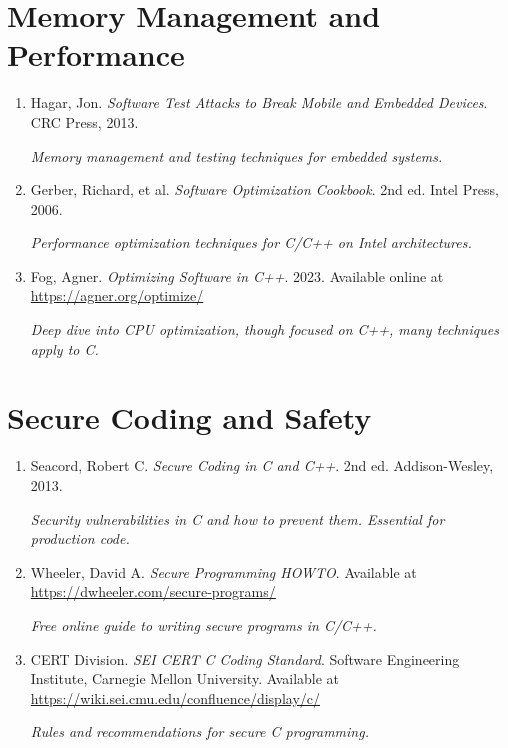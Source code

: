 \documentclass[10pt,openany]{book}
\begin{document}
\section*{Memory Management and Performance}

\begin{enumerate}
    \item Hagar, Jon. \textit{Software Test Attacks to Break Mobile and Embedded Devices}. CRC Press, 2013.

    \textit{Memory management and testing techniques for embedded systems.}

    \item Gerber, Richard, et al. \textit{Software Optimization Cookbook}. 2nd ed. Intel Press, 2006.

    \textit{Performance optimization techniques for C/C++ on Intel architectures.}

    \item Fog, Agner. \textit{Optimizing Software in C++}. 2023. Available online at \url{https://agner.org/optimize/}

    \textit{Deep dive into CPU optimization, though focused on C++, many techniques apply to C.}
\end{enumerate}

\section*{Secure Coding and Safety}

\begin{enumerate}
    \item Seacord, Robert C. \textit{Secure Coding in C and C++}. 2nd ed. Addison-Wesley, 2013.

    \textit{Security vulnerabilities in C and how to prevent them. Essential for production code.}

    \item Wheeler, David A. \textit{Secure Programming HOWTO}. Available at \url{https://dwheeler.com/secure-programs/}

    \textit{Free online guide to writing secure programs in C/C++.}

    \item CERT Division. \textit{SEI CERT C Coding Standard}. Software Engineering Institute, Carnegie Mellon University. Available at \url{https://wiki.sei.cmu.edu/confluence/display/c/}

    \textit{Rules and recommendations for secure C programming.}
\end{enumerate}
\end{document}
